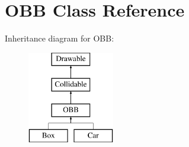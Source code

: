 \hypertarget{class_o_b_b}{}\section{O\+B\+B Class Reference}
\label{class_o_b_b}
Inheritance diagram for O\+B\+B\+:\begin{figure}[H]
\begin{center}
\leavevmode
\includegraphics[height=4.000000cm]{class_o_b_b}
\end{center}
\end{figure}
